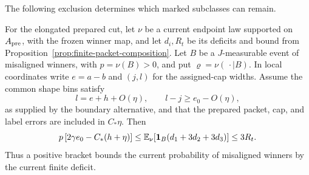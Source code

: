 The following exclusion determines which marked subclasses can remain.

\begin{lemma}
\label{lem:orientation-alignment}
For the elongated prepared cut, let \(\nu\) be a current endpoint
law supported on \(A_{\rm pre}\),
with the frozen winner map, and let \(d_i,R_t\) be its deficits and
bound from Proposition~\ref{prop:finite-packet-composition}.
Let \(B\) be a \(J\)-measurable event of misaligned winners, with
\(p=\nu(B)>0\), and put \(\varrho=\nu(\,\cdot\mid B)\).
In local coordinates write \(e=a-b\) and \((j,l)\) for the
assigned-cap widths.  Assume the common shape bins satisfy
\[
 l=e+h+O(\eta),\qquad l-j\ge e_0-O(\eta),
\]
as supplied by the boundary alternative, and that the prepared
packet, cap, and label errors are included in \(C_*\eta\).
Then
\begin{equation}
 p\,[2\gamma e_0-C_*(h+\eta)]
 \le \mathbb E_\nu\!\left[\boldsymbol1_B(d_1+3d_2+3d_3)\right]
 \le 3R_t .
 \label{eq:alignment-misaligned-mass}
\end{equation}
Thus a positive bracket bounds the current probability of
misaligned winners by the current finite deficit.
\end{lemma}

